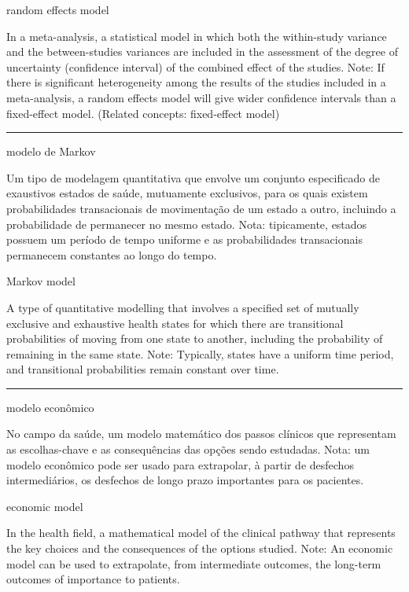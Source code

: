 \documentclass[
]{book}
\begin{document}
random effects model

In a meta-analysis, a statistical model in which both the within-study variance and the between-studies variances are included in the assessment of the degree of uncertainty (confidence interval) of the combined effect of the studies. Note: If there is significant heterogeneity among the results of the studies included in a meta-analysis, a random effects model will give wider confidence intervals than a fixed-effect model. (Related concepts: fixed-effect model)

\begin{center}\rule{0.5\linewidth}{0.5pt}\end{center}

modelo de Markov

Um tipo de modelagem quantitativa que envolve um conjunto especificado de exaustivos estados de saúde, mutuamente exclusivos, para os quais existem probabilidades transacionais de movimentação de um estado a outro, incluindo a probabilidade de permanecer no mesmo estado. Nota: tipicamente, estados possuem um período de tempo uniforme e as probabilidades transacionais permanecem constantes ao longo do tempo.

Markov model

A type of quantitative modelling that involves a specified set of mutually exclusive and exhaustive health states for which there are transitional probabilities of moving from one state to another, including the probability of remaining in the same state. Note: Typically, states have a uniform time period, and transitional probabilities remain constant over time.

\begin{center}\rule{0.5\linewidth}{0.5pt}\end{center}

modelo econômico

No campo da saúde, um modelo matemático dos passos clínicos que representam as escolhas-chave e as consequências das opções sendo estudadas. Nota: um modelo econômico pode ser usado para extrapolar, à partir de desfechos intermediários, os desfechos de longo prazo importantes para os pacientes.

economic model

In the health field, a mathematical model of the clinical pathway that represents the key choices and the consequences of the options studied. Note: An economic model can be used to extrapolate, from intermediate outcomes, the long-term outcomes of importance to patients.
\end{document}
